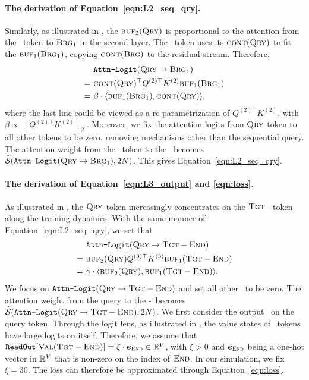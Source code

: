 
\paragraph{The derivation of Equation~\eqref{eqn:L2_seq_qry}.} 
Similarly, as illustrated in , the $\textsc{buf}_2(\textsc{Qry})$ is proportional to the attention from the \query~token to $\textsc{Brg$_1$}$ in the second layer. The \query~token uses its $\textsc{cont}(\textsc{Qry})$ to fit the $\textsc{buf}_1(\textsc{Brg$_1$})$, copying $\textsc{cont}(\textsc{Brg})$ to the residual stream. Therefore, 
\begin{align*} 
~&\texttt{Attn-Logit}(\textsc{Qry}\to\textsc{Brg$_1$})\\
=~&\textsc{cont}(\textsc{Qry})^\top Q^{(2)\top} K^{(2)}\textsc{buf}_1(\textsc{Brg$_1$})\\
=~&\beta \cdot \langle \textsc{buf}_1(\textsc{Brg$_1$}), \textsc{cont}(\textsc{Qry}) \rangle,
\end{align*}
where the last line could be viewed as a re-parametrization of $Q^{(2)\top} K^{(2)}$, with $\beta \propto \|Q^{(2)\top} K^{(2)}\|_2$. Moreover, we fix the attention logits from $\textsc{Qry}$ token to all other tokens to be zero, removing  mechanisms other than the sequential query. The attention weight from the \query~token to the \brga~becomes $\widetilde{\mathcal{S}}(\texttt{Attn-Logit}(\textsc{Qry}\to\textsc{Brg$_1$}), 2N)$. This gives Equation~\eqref{eqn:L2_seq_qry}.

\paragraph{The derivation of Equation~\eqref{eqn:L3_output} and \eqref{eqn:loss}.}
As illustrated in , the $\textsc{Qry}$ token increasingly concentrates on the $\textsc{Tgt}$-\Ed~token along the training dynamics. With the same manner of Equation~\eqref{eqn:L2_seq_qry}, we set that
\begin{align*}
~& \texttt{Attn-Logit}(\textsc{Qry}\to\textsc{Tgt}-\textsc{End})  \\
=~&\textsc{buf}_2(\textsc{Qry}) Q^{(3)\top} K^{(3)}\textsc{buf}_1(\textsc{Tgt}-\textsc{End})\\
= ~& \gamma \cdot \langle \textsc{buf}_2(\textsc{Qry}), \textsc{buf}_1(\textsc{Tgt}-\textsc{End})\rangle.
\end{align*}
We focus on  $\texttt{Attn-Logit}(\textsc{Qry}\to\textsc{Tgt}-\textsc{End})$ and set all other \attlogit~to be zero.
The attention weight from the query to the \target-\Ed~becomes $\widetilde{\mathcal{S}}(\texttt{Attn-Logit}(\textsc{Qry}\to\textsc{Tgt}-\textsc{End}), 2N)$. We first consider the output \logit~on the query token. Through the logit lens, as illustrated in , the value states of \Ed~tokens have large logits on itself. Therefore, we assume that $\texttt{ReadOut}[\textsc{Val}(\textsc{Tgt}-\textsc{End})] = \xi \cdot \bm{e}_{\textsc{End}} \in \mathbb{R}^V$, with $\xi>0$ and $\bm{e}_{\textsc{End}}$ being a one-hot vector in $\mathbb{R}^V$ that is non-zero on the index of $\textsc{End}$. In our simulation, we fix $\xi=30$.
The loss can therefore be approximated through Equation~\eqref{eqn:loss}.

